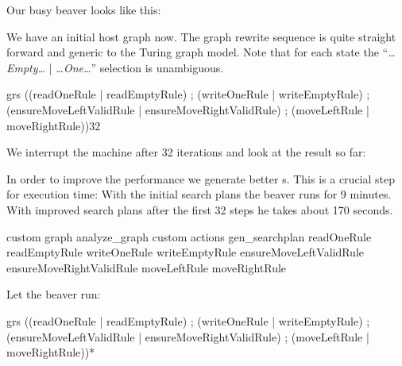 Our busy beaver looks like this:
\begin{center}
\end{center}
We have an initial host graph now. The graph rewrite sequence is quite straight forward and generic to the Turing graph model. Note that for each state the ``\emph{\dots Empty\dots} | \emph{\dots One\dots}'' selection is unambiguous.
\begin{grshell}[firstnumber=last]
  grs ((readOneRule | readEmptyRule) ; (writeOneRule | writeEmptyRule) ; (ensureMoveLeftValidRule | ensureMoveRightValidRule) ; (moveLeftRule | moveRightRule)){32}

\end{grshell}
We interrupt the machine after 32 iterations and look at the result so far:
\begin{center}
\end{center}
In order to improve the performance we generate better s. This is a crucial step for execution time: With the initial search plans the beaver runs for 9 minutes. With improved search plans after the first 32 steps he takes about 170 seconds.
\begin{grshell}[firstnumber=last]
custom graph analyze_graph
custom actions gen_searchplan readOneRule readEmptyRule writeOneRule writeEmptyRule ensureMoveLeftValidRule ensureMoveRightValidRule moveLeftRule moveRightRule

\end{grshell}

Let the beaver run:
\begin{grshell}[firstnumber=last]
  grs ((readOneRule | readEmptyRule) ; (writeOneRule | writeEmptyRule) ; (ensureMoveLeftValidRule | ensureMoveRightValidRule) ; (moveLeftRule | moveRightRule))*
\end{grshell}

